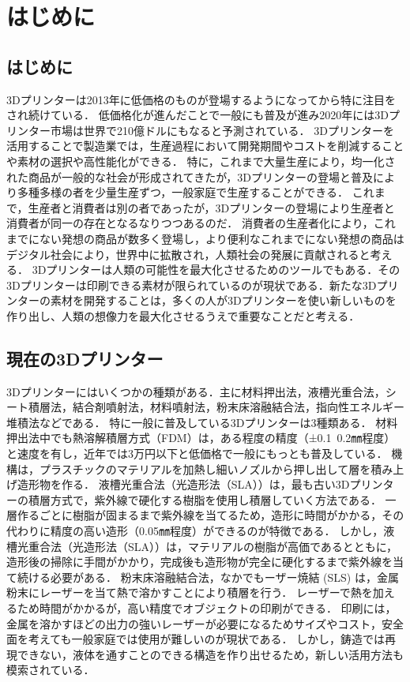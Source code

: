 \chapter{はじめに}
\label{chp:first1}

\section{はじめに}
\label{sec:paragraph}

3Dプリンターは2013年に低価格のものが登場するようになってから特に注目をされ続けている．
低価格化が進んだことで一般にも普及が進み2020年には3Dプリンター市場は世界で210億ドルにもなると予測されている．
3Dプリンターを活用することで製造業では，生産過程において開発期間やコストを削減することや素材の選択や高性能化ができる．
特に，これまで大量生産により，均一化された商品が一般的な社会が形成されてきたが，3Dプリンターの登場と普及により多種多様の者を少量生産ずつ，一般家庭で生産することができる．
これまで，生産者と消費者は別の者であったが，3Dプリンターの登場により生産者と消費者が同一の存在となるなりつつあるのだ． 消費者の生産者化により，これまでにない発想の商品が数多く登場し，より便利なこれまでにない発想の商品はデジタル社会により，世界中に拡散され，人類社会の発展に貢献されると考える．
3Dプリンターは人類の可能性を最大化させるためのツールでもある．その3Dプリンターは印刷できる素材が限られているのが現状である．新たな3Dプリンターの素材を開発することは，多くの人が3Dプリンターを使い新しいものを作り出し、人類の想像力を最大化させるうえで重要なことだと考える．


\section{現在の3Dプリンター}
\label{sec:paragraph1}

3Dプリンターにはいくつかの種類がある．主に材料押出法，液槽光重合法，シート積層法，結合剤噴射法，材料噴射法，粉末床溶融結合法，指向性エネルギー堆積法などである．
特に一般に普及している3Dプリンターは3種類ある．
材料押出法中でも熱溶解積層方式（FDM）は，ある程度の精度（±0.1~0.2㎜程度）と速度を有し，近年では3万円以下と低価格で一般にもっとも普及している．
機構は，プラスチックのマテリアルを加熱し細いノズルから押し出して層を積み上げ造形物を作る．
液槽光重合法（光造形法（SLA））は，最も古い3Dプリンターの積層方式で，紫外線で硬化する樹脂を使用し積層していく方法である．
一層作るごとに樹脂が固まるまで紫外線を当てるため，造形に時間がかかる，その代わりに精度の高い造形（0.05㎜程度）ができるのが特徴である．
しかし，液槽光重合法（光造形法（SLA））は，マテリアルの樹脂が高価であるとともに，造形後の掃除に手間がかかり，完成後も造形物が完全に硬化するまで紫外線を当て続ける必要がある．
粉末床溶融結合法，なかでもーザー焼結 (SLS) は，金属粉末にレーザーを当て熱で溶かすことにより積層を行う．
レーザーで熱を加えるため時間がかかるが，高い精度でオブジェクトの印刷ができる．
印刷には，金属を溶かすほどの出力の強いレーザーが必要になるためサイズやコスト，安全面を考えても一般家庭では使用が難しいのが現状である．
しかし，鋳造では再現できない，液体を通すことのできる構造を作り出せるため，新しい活用方法も模索されている．

